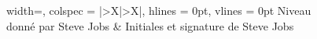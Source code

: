 \documentclass[a4paper,french,12pt,reqno,dvipsnames,table]{memoir}
\begin{document}

\begin{figure}[H]
	\centering
	\begin{tblr}{
		width=\linewidth,
		colspec = {|>{\centering\arraybackslash}X|>{\centering\arraybackslash}X|},
		hlines = {0pt},
		vlines = {0pt}
	}
		Niveau donné par Steve Jobs & Initiales et signature de Steve Jobs
	\end{tblr}
\end{figure}
\end{document}
